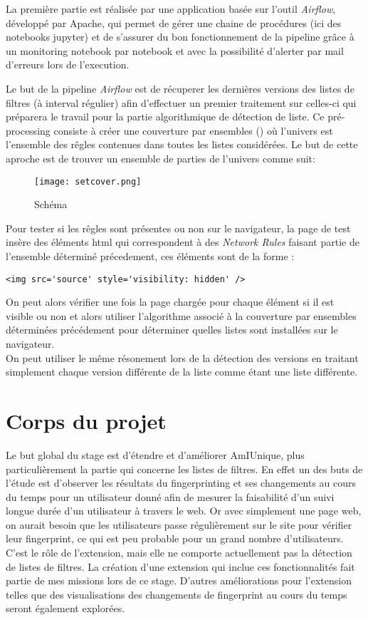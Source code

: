 \documentclass[oneside,a4paper,12pt]{article}
\begin{document}
La première partie est réalisée par une application basée sur l'outil \textit{Airflow}, développé par Apache, qui permet de gérer une chaine de procédures (ici des notebooks jupyter) et de s'assurer du bon fonctionnement de la pipeline grâce à un monitoring notebook par notebook et avec la possibilité d'alerter par mail d'erreurs lors de l'execution.

Le but de la pipeline \textit{Airflow} est de récuperer les dernières versions des listes de filtres (à interval régulier) afin d'effectuer un premier traitement sur celles-ci qui préparera le travail pour la partie algorithmique de détection de liste. Ce pré-processing consiste à créer une couverture par ensembles (\cite{setcover}) où l'univers est l'ensemble des rêgles contenues dans toutes les listes considérées. Le but de cette aproche est de trouver un ensemble de parties de l'univers comme suit:

\begin{figure}[h]
	\centering
	\texttt{[image: setcover.png]}
	\caption{Schéma}
\end{figure}

Pour tester si les rêgles sont présentes ou non sur le navigateur, la page de test insère des éléments html qui correspondent à des \textit{Network Rules} faisant partie de l'ensemble déterminé précedement, ces éléments sont de la forme :
\begin{center}
	\lstinline{<img src='source' style='visibility: hidden' />}
\end{center}
On peut alors vérifier une fois la page chargée pour chaque élément si il est visible ou non et alors utiliser l'algorithme associé à la couverture par ensembles déterminées précédement pour déterminer quelles listes sont installées sur le navigateur.\\

On peut utiliser le même résonement lors de la détection des versions en traitant simplement chaque version différente de la liste comme étant une liste différente.


\section{Corps du projet}\label{Projet}

Le but global du stage est d'étendre et d'améliorer AmIUnique, plus particulièrement la partie qui concerne les listes de filtres. En effet un des buts de l'étude est d'observer les résultats du fingerprinting et ses changements au cours du temps pour un utilisateur donné afin de mesurer la faisabilité d'un suivi longue durée d'un utilisateur à travers le web.
Or avec simplement une page web, on aurait besoin que les utilisateurs passe régulièrement sur le site pour vérifier leur fingerprint, ce qui est peu probable pour un grand nombre d'utilisateurs.
C'est le rôle de l'extension, mais elle ne comporte actuellement pas la détection de listes de filtres. La création d'une extension qui inclue ces fonctionnalités fait partie de mes missions lors de ce stage. D'autres améliorations pour l'extension telles que des visualisations des changements de fingerprint au cours du temps seront également explorées.
\end{document}
